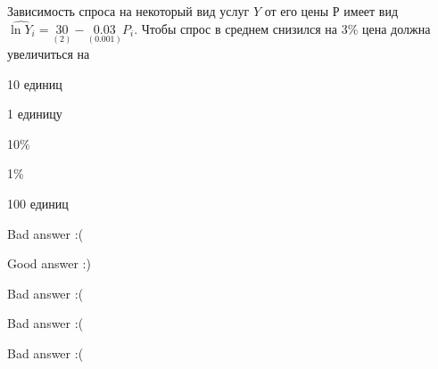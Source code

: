 
\begin{question}
Зависимость спроса на некоторый вид услуг \(Y\) от его цены \(Р\)
имеет вид \(\widehat{\ln Y_i} = \underset{(2)}{30} - \underset{(0.001)}{0.03} P_i\).
Чтобы спрос в среднем снизился на 3\% цена должна увеличиться на
\begin{answerlist}
  \item 10 единиц
  \item 1 единицу
  \item 10\%
  \item 1\%
  \item 100 единиц
\end{answerlist}
\end{question}

\begin{solution}
\begin{answerlist}
  \item Bad answer :(
  \item Good answer :)
  \item Bad answer :(
  \item Bad answer :(
  \item Bad answer :(
\end{answerlist}
\end{solution}

